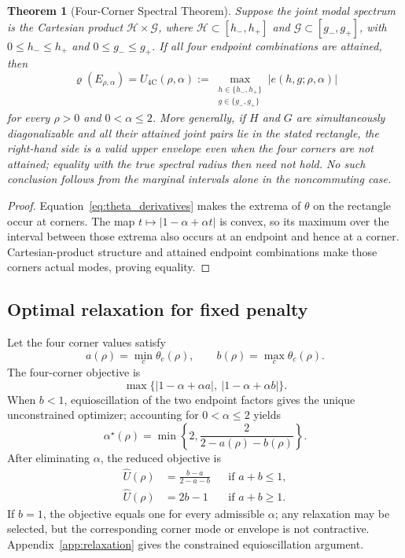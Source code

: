 \documentclass[11pt]{article}
\newtheorem{theorem}{Theorem}[section]
\theoremstyle{definition}
\newcommand{\spr}{\varrho}
\newcommand{\Ufour}{U_{\mathrm{4C}}}
\begin{document}
\begin{theorem}[Four-Corner Spectral Theorem]\label{thm:fourcorner}
Suppose the joint modal spectrum is the Cartesian product
$\mathcal H\times\mathcal G$, where
$\mathcal H\subset[h_-,h_+]$ and
$\mathcal G\subset[g_-,g_+]$, with
$0\le h_-\le h_+$ and $0\le g_-\le g_+$. If all four endpoint combinations
are attained,
then
\begin{equation}
\spr(E_{\rho,\alpha})=
\Ufour(\rho,\alpha):=
\max_{\substack{h\in\{h_-,h_+\}\\g\in\{g_-,g_+\}}}
|e(h,g;\rho,\alpha)|
\label{eq:fourcorner}
\end{equation}
for every $\rho>0$ and $0<\alpha\le2$. More generally, if $H$ and $G$ are
simultaneously diagonalizable and all their attained joint pairs lie in the
stated rectangle, the right-hand side is a valid upper envelope even when the
four corners are not attained; equality with the true spectral radius then
need not hold. No such conclusion follows from the marginal intervals alone
in the noncommuting case.
\end{theorem}
\begin{proof}
Equation~\eqref{eq:theta_derivatives} makes the extrema of $\theta$ on the
rectangle occur at corners. The map
$t\mapsto|1-\alpha+\alpha t|$ is convex, so its maximum over the interval
between those extrema also occurs at an endpoint and hence at a corner.
Cartesian-product structure and attained endpoint combinations make those
corners actual modes, proving equality.
\end{proof}

\subsection{Optimal relaxation for fixed penalty}
Let the four corner values satisfy
\[
a(\rho)=\min_c\theta_c(\rho),\qquad
b(\rho)=\max_c\theta_c(\rho).
\]
The four-corner objective is
\[
\max\{|1-\alpha+\alpha a|,\ |1-\alpha+\alpha b|\}.
\]
When $b<1$, equioscillation of the two endpoint factors gives the unique
unconstrained optimizer; accounting for $0<\alpha\le2$ yields
\begin{equation}
\alpha^\star(\rho)=
\min\left\{2,\frac{2}{2-a(\rho)-b(\rho)}\right\}.
\label{eq:alpha_star}
\end{equation}
After eliminating $\alpha$, the reduced objective is
\begin{align}
\widehat U(\rho)&=\frac{b-a}{2-a-b}
&&\text{if }a+b\le1,\label{eq:reduced_objective}\\
\widehat U(\rho)&=2b-1
&&\text{if }a+b\ge1.\nonumber
\end{align}
If $b=1$, the objective equals one for every admissible $\alpha$; any
relaxation may be selected, but the corresponding corner mode or envelope is
not contractive.
Appendix~\ref{app:relaxation} gives the constrained equioscillation argument.
\end{document}
